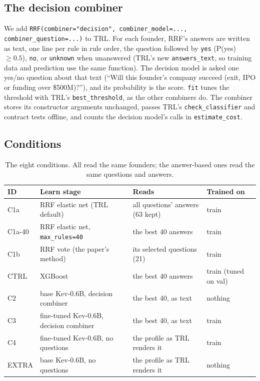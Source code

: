\documentclass{article}
\newcommand{\cond}[1]{#1}
\begin{document}
\subsection{The decision combiner}
\label{sec:combiner}

We add \texttt{RRF(combiner="decision", combiner\_model=..., combiner\_question=...)} to TRL. For
each founder, RRF's answers are written as text, one line per rule in rule order, the question
followed by \texttt{yes} (P(yes) $\geq 0.5$), \texttt{no}, or \texttt{unknown} when unanswered
(TRL's new \texttt{answers\_text}, so training data and prediction use the same function). The
decision model is asked one yes/no question about that text (``Will this founder's company succeed
(exit, IPO or funding over \$500M)?''), and its probability is the score. \texttt{fit} tunes the
threshold with TRL's \texttt{best\_threshold}, as the other combiners do. The combiner stores its
constructor arguments unchanged, passes TRL's \texttt{check\_classifier} and contract tests
offline, and counts the decision model's calls in \texttt{estimate\_cost}.

\subsection{Conditions}

\begin{table}[t]
\centering\small
\caption{The eight conditions. All read the same founders; the answer-based ones read the same
questions and answers.}
\label{tab:conditions}
\begin{tabularx}{\textwidth}{@{}l X l l@{}}
\toprule
ID & Learn stage & Reads & Trained on \\
\midrule
\cond{C1a} & RRF elastic net (TRL default) & all questions' answers (63 kept) & train \\
\cond{C1a-40} & RRF elastic net, \texttt{max\_rules=40} & the best 40 answers & train \\
\cond{C1b} & RRF vote (the paper's method) & its selected questions (21) & train \\
\cond{CTRL} & XGBoost & the best 40 answers & train (tuned on val) \\
\cond{C2} & base Kev-0.6B, decision combiner & the best 40, as text & nothing \\
\cond{C3} & fine-tuned Kev-0.6B, decision combiner & the best 40, as text & train \\
\cond{C4} & fine-tuned Kev-0.6B, no questions & the profile as TRL renders it & train \\
\cond{EXTRA} & base Kev-0.6B, no questions & the profile as TRL renders it & nothing \\
\bottomrule
\end{tabularx}
\end{table}
\end{document}
